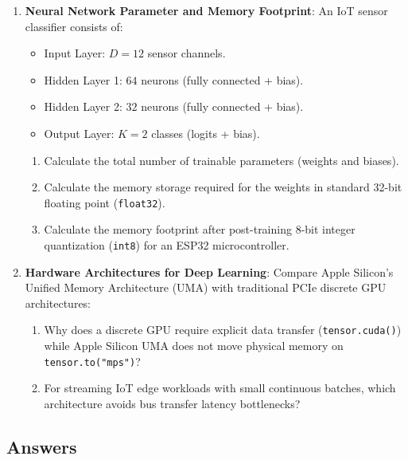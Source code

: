 \begin{checkyourself}
\begin{enumerate}
    \item \textbf{Neural Network Parameter and Memory Footprint}:
    An IoT sensor classifier consists of:
    \begin{itemize}
        \item Input Layer: $D = 12$ sensor channels.
        \item Hidden Layer 1: $64$ neurons (fully connected + bias).
        \item Hidden Layer 2: $32$ neurons (fully connected + bias).
        \item Output Layer: $K = 2$ classes (logits + bias).
    \end{itemize}
    \begin{enumerate}[label=(\alph*)]
        \item Calculate the total number of trainable parameters (weights and biases).
        \item Calculate the memory storage required for the weights in standard 32-bit floating point (\texttt{float32}).
        \item Calculate the memory footprint after post-training 8-bit integer quantization (\texttt{int8}) for an ESP32 microcontroller.
    \end{enumerate}

    \item \textbf{Hardware Architectures for Deep Learning}:
    Compare Apple Silicon's Unified Memory Architecture (UMA) with traditional PCIe discrete GPU architectures:
    \begin{enumerate}[label=(\alph*)]
        \item Why does a discrete GPU require explicit data transfer (\texttt{tensor.cuda()}) while Apple Silicon UMA does not move physical memory on \texttt{tensor.to("mps")}?
        \item For streaming IoT edge workloads with small continuous batches, which architecture avoids bus transfer latency bottlenecks?
    \end{enumerate}
\end{enumerate}
\end{checkyourself}

\subsection*{Answers}\label{subsec:pytorch_answers}

